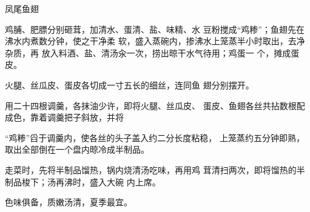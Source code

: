 \begin{recipe}{凤尾鱼翅}

\ingredients




\cooking

\step 鸡脯、肥膘分别砸茸，加清水、蛋清、盐、味精、水 豆粉搅成“鸡糁”；鱼翅先在沸水内煮数分钟，使之干净柔 软，盛入蒸碗内，掺沸水上笼蒸半小时取出，去净杂质，再 放入料酒、盐、清汤汆一次，捞出晾干水气待用；鸡蛋一 个，摊成蛋皮。

\step 火腿、丝瓜皮、蛋皮各切成一寸五长的细丝，连同鱼 翅分别摆开。

\step 用二十四根调羹，各抹油少许，即将火腿、丝瓜皮、 蛋皮、鱼翅各丝共拈数根配成色，靠着调羹把子斜放，并将

“鸡糁”舀于调羹内，使各丝的头子盖入约二分长度粘稳， 上笼蒸约五分钟即熟，取出全部倒在一个盘内晾冷成半制品。

\step 走菜时，先将半制品馏热，锅内烧清汤吃味，再用鸡 茸清扫两次，即将馏热的半制品梭下；汤再沸时，盛入大碗 内上席。

\notes

色味俱备，质嫩汤清，夏季最宜。

\end{recipe}

